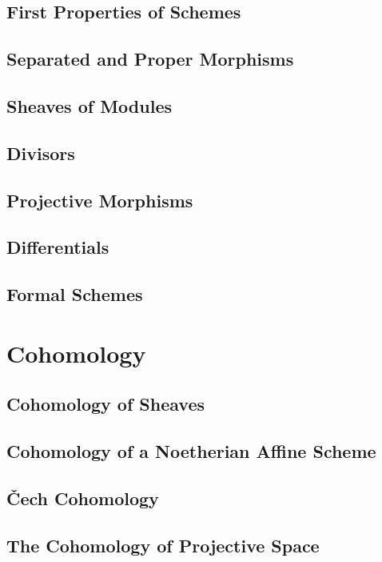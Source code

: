 \documentclass[oneside]{amsbook}
\begin{document}
\section{First Properties of Schemes}

\section{Separated and Proper Morphisms}

\section{Sheaves of Modules}

\section{Divisors}

\section{Projective Morphisms}

\section{Differentials}

\section{Formal Schemes}


\chapter{Cohomology}
\setcounter{section}{1}
\section{Cohomology of Sheaves}

\section{Cohomology of a Noetherian Affine Scheme}

\section{Čech Cohomology}

\section{The Cohomology of Projective Space}

\end{document}
